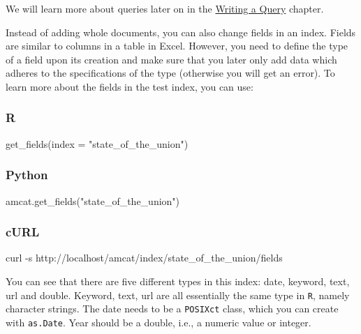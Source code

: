 \documentclass[
  letterpaper,
  DIV=11,
  numbers=noendperiod]{scrreprt}
\newenvironment{Shaded}{\begin{snugshade}}{\end{snugshade}}
\newcommand{\AttributeTok}[1]{\textcolor[rgb]{0.40,0.45,0.13}{#1}}
\newcommand{\ExtensionTok}[1]{\textcolor[rgb]{0.00,0.23,0.31}{#1}}
\newcommand{\FunctionTok}[1]{\textcolor[rgb]{0.28,0.35,0.67}{#1}}
\newcommand{\NormalTok}[1]{\textcolor[rgb]{0.00,0.23,0.31}{#1}}
\newcommand{\StringTok}[1]{\textcolor[rgb]{0.13,0.47,0.30}{#1}}
\begin{document}
We will learn more about queries later on in the \href{}{Writing a
Query} chapter.

Instead of adding whole documents, you can also change fields in an
index. Fields are similar to columns in a table in Excel. However, you
need to define the type of a field upon its creation and make sure that
you later only add data which adheres to the specifications of the type
(otherwise you will get an error). To learn more about the fields in the
test index, you can use:

\subsubsection{R}

\begin{Shaded}
\begin{Highlighting}[]
\FunctionTok{get\_fields}\NormalTok{(}\AttributeTok{index =} \StringTok{"state\_of\_the\_union"}\NormalTok{)}
\end{Highlighting}
\end{Shaded}

\subsubsection{Python}

\begin{Shaded}
\begin{Highlighting}[]
\NormalTok{amcat.get\_fields(}\StringTok{"state\_of\_the\_union"}\NormalTok{)}
\end{Highlighting}
\end{Shaded}

\subsubsection{cURL}

\begin{Shaded}
\begin{Highlighting}[]
\ExtensionTok{curl} \AttributeTok{{-}s}\NormalTok{ http://localhost/amcat/index/state\_of\_the\_union/fields}
\end{Highlighting}
\end{Shaded}

You can see that there are five different types in this index: date,
keyword, text, url and double. Keyword, text, url are all essentially
the same type in \texttt{R}, namely character strings. The date needs to
be a \texttt{POSIXct} class, which you can create with \texttt{as.Date}.
Year should be a double, i.e., a numeric value or integer.
\end{document}
